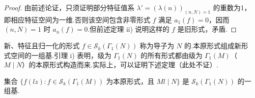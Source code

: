 \begin{proof}

由前述论证，只须证明部分特征值系 $\lambda'=(\lambda(n))_{(n,N)=1}$ 的重数为1，即相应特征空间为一维.否则该空间包含非零形式 $f$ 满足 $a_1(f)=0$，因而 $(n,N)=1$ 时 $a_n(f)=0$.但前述定理 ii) 说明这样的 $f$ 是旧形式，矛盾.

\end{proof}

新、特征且归一化的形式 $f\in\mathcal S_k(\Gamma_1(N))$ 称为导子为 $N$ 的.本原形式组成新形式空间的一组基.引理 i) 表明，级为 $\Gamma_1(N)$ 的所有形式都由级为 $\Gamma_1(M)$（$M\mid N$）的本原形式构造而来.实际上，可以证明下述定理（此处不证）.

\begin{theorem*}

集合 $\{f(lz):f\in\mathcal S_k(\Gamma_1(M))\text{ 为本原形式，且 }Ml\mid N\}$ 是 $\mathcal S_k(\Gamma_1(N))$ 的一组基.

\end{theorem*}

